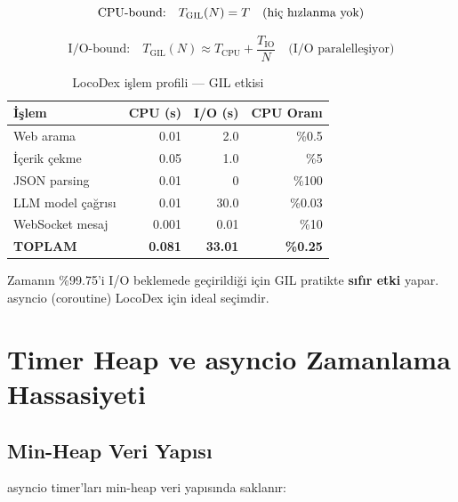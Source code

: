 \begin{equation}
\label{eq:gil-cpu}
\text{CPU-bound:} \quad T_{\mathrm{GIL}}(N) = T \quad \text{(hi\c{c} h{\i}zlanma yok)}
\end{equation}

\begin{equation}
\label{eq:gil-io}
\text{I/O-bound:} \quad T_{\mathrm{GIL}}(N) \approx T_{\mathrm{CPU}} + \frac{T_{\mathrm{IO}}}{N} \quad \text{(I/O paralelle\c{s}iyor)}
\end{equation}

\begin{table}[H]
\centering
\caption{LocoDex i\c{s}lem profili --- GIL etkisi}
\label{tab:gil-profile}
\begin{tabularx}{\textwidth}{Xrrr}
\toprule
\color{chapterBlue}\textbf{\.{I}\c{s}lem} & \color{chapterBlue}\textbf{CPU (s)} & \color{chapterBlue}\textbf{I/O (s)} & \color{chapterBlue}\textbf{CPU Oran{\i}} \\
\midrule
Web arama          & 0.01  & 2.0   & \%0.5 \\
\.{I}\c{c}erik \c{c}ekme      & 0.05  & 1.0   & \%5 \\
JSON parsing       & 0.01  & 0     & \%100 \\
LLM model \c{c}a\u{g}r{\i}s{\i} & 0.01  & 30.0  & \%0.03 \\
WebSocket mesaj    & 0.001 & 0.01  & \%10 \\
\midrule
\textbf{TOPLAM}    & \textbf{0.081} & \textbf{33.01} & \textbf{\%0.25} \\
\bottomrule
\end{tabularx}
\end{table}

Zaman{\i}n \%99.75'i I/O beklemede ge\c{c}irildi\u{g}i i\c{c}in GIL pratikte \textbf{s{\i}f{\i}r etki} yapar. asyncio (coroutine) LocoDex i\c{c}in ideal se\c{c}imdir.


\section{Timer Heap ve asyncio Zamanlama Hassasiyeti}
\label{sec:timer-heap}

\subsection{Min-Heap Veri Yap{\i}s{\i}}
\label{sec:min-heap}

asyncio timer'lar{\i} min-heap veri yap{\i}s{\i}nda saklan{\i}r:

